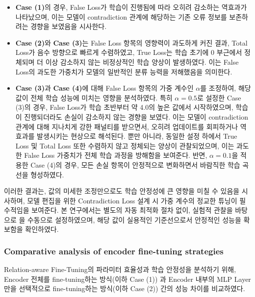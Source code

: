 \documentclass[a4paper,fleqn]{cas-sc}
\begin{document}
\begin{itemize}
    \item \textbf{Case (1)}의 경우, False Loss가 학습이 진행됨에 따라 오히려 감소하는 역효과가 나타났으며, 이는 모델이 contradiction 관계에 해당하는 기존 오류 정보를 보존하려는 경향을 보였음을 시사한다.
    
    \item \textbf{Case (2)}와 \textbf{Case (3)}는 False Loss 항목의 영향력이 과도하게 커진 결과, Total Loss가 음수 방향으로 빠르게 수렴하였고, True Loss는 학습 초기에 0 부근에서 정체되며 더 이상 감소하지 않는 비정상적인 학습 양상이 발생하였다. 이는 False Loss의 과도한 가중치가 모델의 일반적인 분류 능력을 저해했음을 의미한다.
    
    \item \textbf{Case (3)}과 \textbf{Case (4)}에 대해 False Loss 항목의 가중 계수인  \(\alpha \)를 조정하여, 해당 값이 전체 학습 성능에 미치는 영향을 분석하였다. 특히  \(\alpha = 0.5\)로 설정한 Case (3)의 경우, False Loss가 학습 초반부터 약 4.0의 높은 값에서 시작하였으며, 학습이 진행되더라도 손실이 감소하지 않는 경향을 보였다. 이는 모델이 contradiction 관계에 대해 지나치게 강한 패널티를 받으면서, 오히려 업데이트를 회피하거나 역효과를 발생시키는 현상으로 해석된다. 뿐만 아니라, 동일한 설정 하에서 True Loss 및 Total Loss 또한 수렴하지 않고 정체되는 양상이 관찰되었으며, 이는 과도한 False Loss 가중치가 전체 학습 과정을 방해함을 보여준다. 반면, \(\alpha = 0.1\)을 적용한 Case (4)의 경우, 모든 손실 항목이 안정적으로 변화하면서 바람직한 학습 곡선을 형성하였다.
    
\end{itemize}
    
이러한 결과는, 값의 미세한 조정만으로도 학습 안정성에 큰 영향을 미칠 수 있음을 시사하며, 모델 편집을 위한 Contradiction Loss 설계 시 가중 계수의 정교한 튜닝이 필수적임을 보여준다. 본 연구에서는 별도의 자동 최적화 절차 없이, 실험적 관찰을 바탕으로 을 수동으로 설정하였으며, 해당 값이 실용적인 기준선으로서 안정적인 성능을 확보함을 확인하였다.

\subsubsection{Comparative analysis of encoder fine-tuning strategies}

Relation-aware Fine-Tuning의 파라미터 효율성과 학습 안정성을 분석하기 위해, Encoder 전체를 fine-tuning하는 방식(이하 Case (1)) 과 Encoder 내부의 MLP Layer만을 선택적으로 fine-tuning하는 방식(이하 Case (2)) 간의 성능 차이를 비교하였다.
\end{document}
